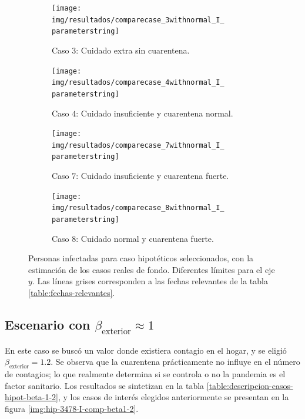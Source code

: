 \begin{figure}
     \centering
     \begin{subfigure}[b]{.47\textwidth}
         \centering
         \texttt{[image: img/resultados/comparecase\_3withnormal\_I\_\\parameterstring]}
         \caption{Caso \(3\): Cuidado extra sin cuarentena.}
     \end{subfigure}
     \hfill
     \begin{subfigure}[b]{.47\textwidth}
         \centering
         \texttt{[image: img/resultados/comparecase\_4withnormal\_I\_\\parameterstring]}
         \caption{Caso \(4\): Cuidado insuficiente y cuarentena normal.}
     \end{subfigure}
     \hfill
     \begin{subfigure}[b]{.47\textwidth}
         \centering
         \texttt{[image: img/resultados/comparecase\_7withnormal\_I\_\\parameterstring]}
         \caption{Caso \(7\): Cuidado insuficiente y cuarentena fuerte.}
     \end{subfigure}
     \hfill
     \begin{subfigure}[b]{.47\textwidth}
         \centering
         \texttt{[image: img/resultados/comparecase\_8withnormal\_I\_\\parameterstring]}
         \caption{Caso \(8\): Cuidado normal y cuarentena fuerte.}
     \end{subfigure}
        \caption[Personas infectadas para caso hipotéticos seleccionados.]{Personas infectadas para caso hipotéticos seleccionados, con la estimación de los casos reales de fondo. Diferentes límites para el eje \(y\). Las líneas grises corresponden a las fechas relevantes de la tabla \ref{table:fechas-relevantes}.}
        \label{img:hip-3478-I-comp}
\end{figure}


\subsection{Escenario con \(\beta_{\text{exterior}} \approx 1\)}

En este caso se buscó un valor donde existiera contagio en el hogar, y se eligió \(\beta_{\text{exterior}} = 1.2\). Se observa que la cuarentena prácticamente no influye en el número de contagios; lo que realmente determina si se controla o no la pandemia es el factor sanitario. Los resultados se sintetizan en la tabla \ref{table:descripcion-casos-hipot-beta-1-2}, y los casos de interés elegidos anteriormente se presentan en la figura \ref{img:hip-3478-I-comp-beta1-2}.



